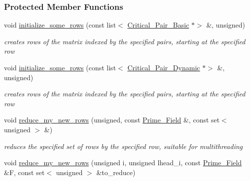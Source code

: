 \subsubsection*{Protected Member Functions}
\begin{DoxyCompactItemize}
\item 
\mbox{\label{group___g_b_computation_abdcffbc4a0a83211bea0385d851a4fb4}} 
void \hyperlink{group___g_b_computation_abdcffbc4a0a83211bea0385d851a4fb4}{initialize\+\_\+some\+\_\+rows} (const list$<$ \hyperlink{group___g_b_computation_class_critical___pair___basic}{Critical\+\_\+\+Pair\+\_\+\+Basic} $\ast$$>$ \&, unsigned)
\begin{DoxyCompactList}\small\item\em creates rows of the matrix indexed by the specified pairs, starting at the specified row \end{DoxyCompactList}\item 
\mbox{\label{group___g_b_computation_ada3c0b561fefae7da3c28b6f6574cbc0}} 
void \hyperlink{group___g_b_computation_ada3c0b561fefae7da3c28b6f6574cbc0}{initialize\+\_\+some\+\_\+rows} (const list$<$ \hyperlink{group___g_b_computation_class_critical___pair___dynamic}{Critical\+\_\+\+Pair\+\_\+\+Dynamic} $\ast$$>$ \&, unsigned)
\begin{DoxyCompactList}\small\item\em creates rows of the matrix indexed by the specified pairs, starting at the specified row \end{DoxyCompactList}\item 
\mbox{\label{group___g_b_computation_a354bbe37c36c47326f4e82adccb6feff}} 
void \hyperlink{group___g_b_computation_a354bbe37c36c47326f4e82adccb6feff}{reduce\+\_\+my\+\_\+new\+\_\+rows} (unsigned, const \hyperlink{group___fields_group_class_prime___field}{Prime\+\_\+\+Field} \&, const set$<$ unsigned $>$ \&)
\begin{DoxyCompactList}\small\item\em reduces the specified set of rows by the specified row, suitable for multithreading \end{DoxyCompactList}\item 
void \hyperlink{group___g_b_computation_ae75be9f5946c90ea68cbae7276dfd36c}{reduce\+\_\+my\+\_\+new\+\_\+rows} (unsigned i, unsigned lhead\+\_\+i, const \hyperlink{group___fields_group_class_prime___field}{Prime\+\_\+\+Field} \&F, const set$<$ unsigned $>$ \&to\+\_\+reduce)

\end{DoxyCompactItemize}

